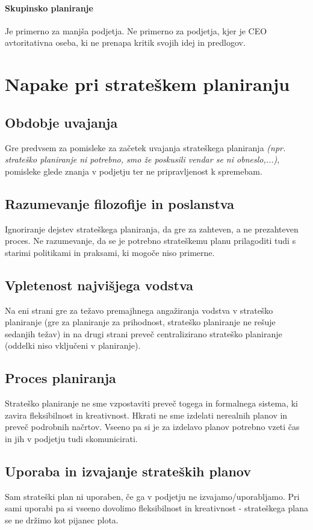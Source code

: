 \documentclass[a4paper,12pt]{report}
\begin{document}
      \paragraph{Skupinsko planiranje} Je primerno za manjša podjetja. Ne primerno za podjetja, kjer je CEO avtoritativna oseba, ki ne prenapa kritik svojih idej in predlogov.

   \section{Napake pri strateškem planiranju}
      \subsection{Obdobje uvajanja}
         Gre predvsem za pomisleke za začetek uvajanja strateškega planiranja \emph{(npr. strateško planiranje ni potrebno, smo že poskusili vendar se ni obneslo,...)},
         pomisleke glede znanja v podjetju ter ne pripravljenost k spremebam.
      \subsection{Razumevanje filozofije in poslanstva}
         Ignoriranje dejstev strateškega planiranja, da gre za zahteven, a ne prezahteven proces. Ne razumevanje, da se je potrebno strateškemu planu prilagoditi tudi s starimi politikami in praksami, ki mogoče niso primerne.
      \subsection{Vpletenost najvišjega vodstva}
         Na eni strani gre za težavo premajhnega angažiranja vodstva v strateško planiranje (gre za planiranje za prihodnost, strateško planiranje ne rešuje sedanjih težav) in na drugi strani preveč centralizirano strateško planiranje (oddelki niso vključeni v planiranje).
      \subsection{Proces planiranja}
         Strateško planiranje ne sme vzpostaviti preveč togega in formalnega sistema, ki zavira fleksibilnost in kreativnost. Hkrati ne sme izdelati nerealnih planov in preveč podrobnih načrtov. Vseeno pa si je za izdelavo planov potrebno vzeti čas in jih v podjetju tudi skomunicirati.
      \subsection{Uporaba in izvajanje strateških planov}
         Sam strateški plan ni uporaben, če ga v podjetju ne izvajamo/uporabljamo. Pri sami uporabi pa si vseeno dovolimo fleksibilnost in kreativnost - strateškega plana se ne držimo kot pijanec plota.
\end{document}
